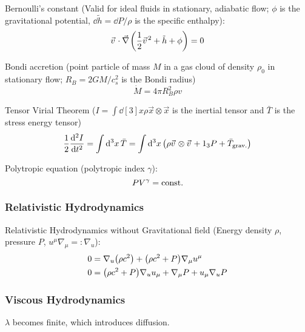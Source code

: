 			\noindent
			Bernoulli's constant (Valid for ideal fluids in stationary, adiabatic flow; $\phi$ is the gravitational potential, $\dd \tilde{h} = \dd P / \rho$ is the specific enthalpy):
			\begin{equation}
				\vec{v}\cdot \Nabla \qty(\frac{1}{2}\vec{v}^2 + \tilde{h} + \phi) = 0
			\end{equation}

			\noindent
			Bondi accretion (point particle of mass $M$ in a gas cloud of density $\rho_0$ in stationary flow; $R_B = 2 G M/c_s^2$ is the Bondi radius)
			\begin{equation}
				\dot{M} = 4 \pi R_B^2 \rho v
			\end{equation}

			\noindent
			Tensor Virial Theorem ($I = 	\int \dd[3]{x} \rho \vec{x} \otimes \vec{x}$ is the inertial tensor and $\bar{T}$ is the stress energy tensor)
			\begin{equation}
				\frac{1}{2}\dv[2]{I}{t}
				= \int \dd[3]{x} \bar{T}
				= \int \dd[3]{x} \qty(\rho \vec{v}\otimes\vec{v} + 1_3 P + \bar{T}_{\text{grav.}})
			\end{equation}

			\noindent
			Polytropic equation (polytropic index $\gamma$):
			\begin{equation}
				\label{eq:PolytropicEquation}
				P V^\gamma = \mathrm{const.}
			\end{equation}


		\subsubsection{Relativistic Hydrodynamics}
			Relativistic Hydrodynamics without Gravitational field (Energy density $\rho$, pressure $P$, $u^\mu \nabla_\mu =: \nabla_u$):
			\begin{equation}
				\begin{aligned}
					0 &= \nabla_u \qty(\rho c^2) + \qty(\rho c^2 + P) \nabla_\mu u^\mu \\
					0 &= \qty(\rho c^2 + P) \nabla_u u_\mu + \nabla_\mu P + u_\mu \nabla_u P \\
				\end{aligned}
			\end{equation}

		\subsubsection{Viscous Hydrodynamics}
			$\lambda$ becomes finite, which introduces diffusion.

